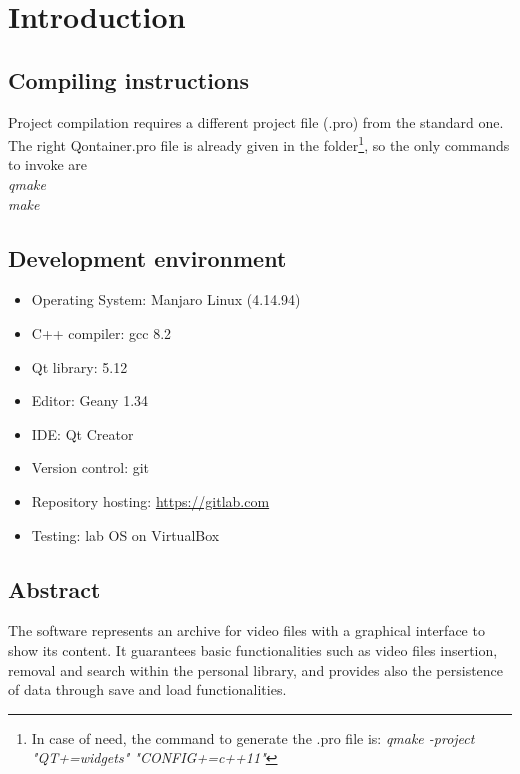 \section{Introduction}

\subsection{Compiling instructions}

Project compilation requires a different project file (.pro) from the standard one. The right Qontainer.pro file is already given in the folder\footnote{In case of need, the command to generate the .pro file is: \textit{qmake -project "QT+=widgets" "CONFIG+=c++11"}}, so the only commands to invoke are \\ 
\textit{qmake} \\
\textit{make}

\subsection{Development environment}
\begin{itemize}
\item Operating System: Manjaro Linux (4.14.94)
\item C++ compiler: gcc 8.2
\item Qt library: 5.12
\item Editor: Geany 1.34
\item IDE: Qt Creator
\item Version control: git
\item Repository hosting: \url{https://gitlab.com}
\item Testing: lab OS on VirtualBox
\end{itemize}

\subsection{Abstract}
The software represents an archive for video files with a graphical interface to show its content. It guarantees basic functionalities such as video files insertion, removal and search within the personal library, and provides also the persistence of data through save and load functionalities.